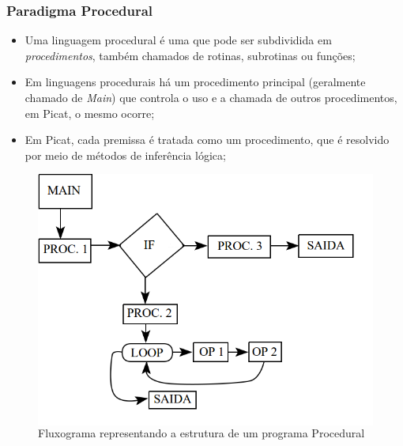\begin{frame}
	\frametitle{Paradigma Procedural}
    
    \begin{itemize}
    
    	\item Uma linguagem procedural é uma que pode ser subdividida em \textit{procedimentos},
        também chamados de rotinas, subrotinas ou funções;
        
        \item Em linguagens procedurais há um procedimento principal (geralmente chamado de 
        \textit{Main}) que controla o uso e a chamada de outros procedimentos, em Picat, o mesmo
        ocorre;
        
        \item Em Picat, cada premissa é tratada como um procedimento, que é resolvido por meio
        de métodos de inferência lógica;
       
    \end{itemize}
    
    \begin{figure}
    	\begin{columns}
	         \includegraphics[width=.8\textwidth] {figures/Paradigma_Procedural.png}
             \caption{Fluxograma representando a estrutura de um programa Procedural}
	         \label{Fluxograma Procedural}
		\end{columns}
	\end{figure}
    
\end{frame}


